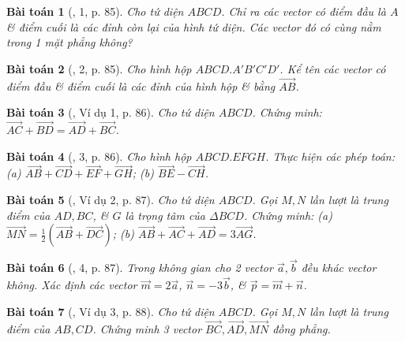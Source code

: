 \documentclass{article}
\numberwithin{equation}{section}
\newtheorem{baitoan}{Bài toán}
\begin{document}
\begin{baitoan}[\cite{SGK_Toan_11_hinh_hoc_co_ban}, 1, p. 85]
	Cho tứ diện $ABCD$. Chỉ ra các vector có điểm đầu là $A$ \& điểm cuối là các đỉnh còn lại của hình tứ diện. Các vector đó có cùng nằm trong 1 mặt phẳng không?
\end{baitoan}

\begin{baitoan}[\cite{SGK_Toan_11_hinh_hoc_co_ban}, 2, p. 85]
	Cho hình hộp $ABCD.A'B'C'D'$. Kể tên các vector có điểm đầu \& điểm cuối là các đỉnh của hình hộp \& bằng $\overrightarrow{AB}$.
\end{baitoan}

\begin{baitoan}[\cite{SGK_Toan_11_hinh_hoc_co_ban}, Ví dụ 1, p. 86]
	Cho tứ diện $ABCD$. Chứng minh: $\overrightarrow{AC} + \overrightarrow{BD} = \overrightarrow{AD} + \overrightarrow{BC}$.
\end{baitoan}

\begin{baitoan}[\cite{SGK_Toan_11_hinh_hoc_co_ban}, 3, p. 86]
	Cho hình hộp $ABCD.EFGH$. Thực hiện các phép toán: (a) $\overrightarrow{AB} + \overrightarrow{CD} + \overrightarrow{EF} + \overrightarrow{GH}$; (b) $\overrightarrow{BE} - \overrightarrow{CH}$.
\end{baitoan}

\begin{baitoan}[\cite{SGK_Toan_11_hinh_hoc_co_ban}, Ví dụ 2, p. 87]
	Cho tứ diện $ABCD$. Gọi $M,N$ lần lượt là trung điểm của $AD,BC$, \& $G$ là trọng tâm của $\Delta BCD$. Chứng minh: (a) $\overrightarrow{MN} = \frac{1}{2}(\overrightarrow{AB} + \overrightarrow{DC})$; (b) $\overrightarrow{AB} + \overrightarrow{AC} + \overrightarrow{AD} = 3\overrightarrow{AG}$.
\end{baitoan}

\begin{baitoan}[\cite{SGK_Toan_11_hinh_hoc_co_ban}, 4, p. 87]
	Trong không gian cho 2 vector $\vec{a},\vec{b}$ đều khác vector không. Xác định các vector $\vec{m} = 2\vec{a}$, $\vec{n} = -3\vec{b}$, \& $\vec{p} = \vec{m} + \vec{n}$.
\end{baitoan}

\begin{baitoan}[\cite{SGK_Toan_11_hinh_hoc_co_ban}, Ví dụ 3, p. 88]
	Cho tứ diện $ABCD$. Gọi $M,N$ lần lượt là trung điểm của $AB,CD$. Chứng minh 3 vector $\overrightarrow{BC},\overrightarrow{AD},\overrightarrow{MN}$ đồng phẳng.
\end{baitoan}
\end{document}
